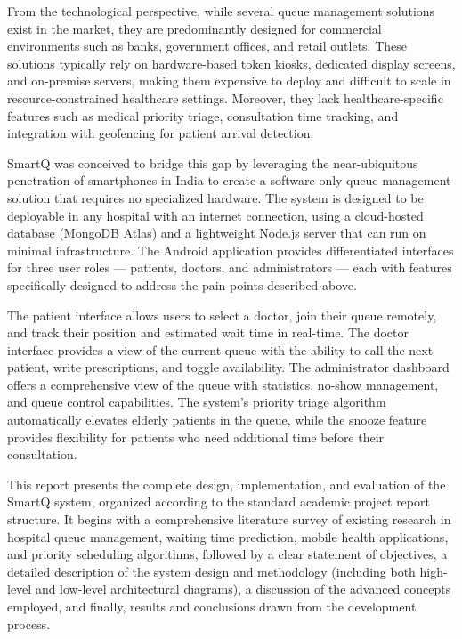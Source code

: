 \documentclass[12pt,a4paper]{article}
\begin{document}
From the technological perspective, while several queue management solutions exist in the market, they are predominantly designed for commercial environments such as banks, government offices, and retail outlets. These solutions typically rely on hardware-based token kiosks, dedicated display screens, and on-premise servers, making them expensive to deploy and difficult to scale in resource-constrained healthcare settings. Moreover, they lack healthcare-specific features such as medical priority triage, consultation time tracking, and integration with geofencing for patient arrival detection.

SmartQ was conceived to bridge this gap by leveraging the near-ubiquitous penetration of smartphones in India to create a software-only queue management solution that requires no specialized hardware. The system is designed to be deployable in any hospital with an internet connection, using a cloud-hosted database (MongoDB Atlas) and a lightweight Node.js server that can run on minimal infrastructure. The Android application provides differentiated interfaces for three user roles --- patients, doctors, and administrators --- each with features specifically designed to address the pain points described above.

The patient interface allows users to select a doctor, join their queue remotely, and track their position and estimated wait time in real-time. The doctor interface provides a view of the current queue with the ability to call the next patient, write prescriptions, and toggle availability. The administrator dashboard offers a comprehensive view of the queue with statistics, no-show management, and queue control capabilities. The system's priority triage algorithm automatically elevates elderly patients in the queue, while the snooze feature provides flexibility for patients who need additional time before their consultation.

This report presents the complete design, implementation, and evaluation of the SmartQ system, organized according to the standard academic project report structure. It begins with a comprehensive literature survey of existing research in hospital queue management, waiting time prediction, mobile health applications, and priority scheduling algorithms, followed by a clear statement of objectives, a detailed description of the system design and methodology (including both high-level and low-level architectural diagrams), a discussion of the advanced concepts employed, and finally, results and conclusions drawn from the development process.
\end{document}
